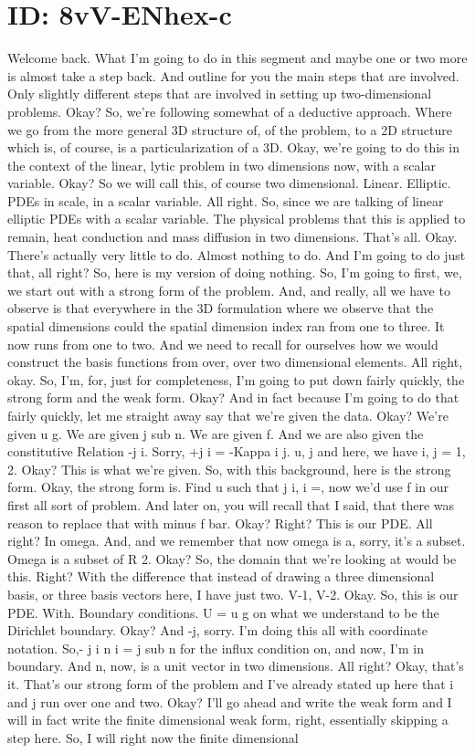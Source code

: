 \documentclass[10pt]{article}
\begin{document}
\section*{ID: 8vV-ENhex-c}
Welcome back. What I'm going to do in this segment and maybe one or two more is  almost take a step back. And outline for you the main steps that are involved. Only slightly different steps that are involved in setting up two-dimensional problems. Okay? So, we're following somewhat of a deductive approach. Where we go from the more general 3D structure of, of the problem, to a 2D structure which is, of course, is a particularization of a 3D. Okay, we're going to do this in the context of the linear, lytic problem in two dimensions now, with a scalar variable. Okay? So we will call this, of course two dimensional. Linear. Elliptic. PDEs in scale, in a scalar variable. All right. So, since we are talking of linear elliptic PDEs with a scalar variable. The physical problems that this is applied to remain, heat conduction and mass diffusion in two dimensions. That's all. Okay. There's actually very little to do. Almost nothing to do. And I'm going to do just that, all right? So, here is my version of doing nothing. So, I'm going to first, we, we start out with a strong form of the problem. And, and really, all we have to observe is that everywhere in the 3D formulation where we observe that the spatial dimensions could the spatial dimension index ran from one to three. It now runs from one to two. And we need to recall for ourselves how we would construct the basis functions from over, over two dimensional elements. All right, okay. So, I'm, for, just for completeness, I'm going to put down fairly quickly, the strong form and the weak form. Okay? And in fact because I'm going to do that fairly quickly, let me straight away say that we're given the data. Okay? We're given u g. We are given j sub n. We are given f. And we are also given the constitutive Relation  -j i. Sorry, +j i = -Kappa i j. u, j and here, we have i, j = 1, 2. Okay? This is what we're given. So, with this background, here is the strong form. Okay, the strong form is. Find u such that j i, i =, now we'd use f in our first all sort of problem. And later on, you will recall that I said, that there was reason to replace that with minus f bar. Okay? Right? This is our PDE. All right? In omega. And, and we remember that now omega is a, sorry, it's a subset. Omega is a subset of R 2. Okay? So, the domain that we're looking at would be this. Right? With the difference that instead of drawing a three dimensional basis, or three basis vectors here, I have just two. V-1, V-2. Okay. So, this is our PDE. With. Boundary conditions. U = u g on what we understand to be the Dirichlet boundary. Okay? And -j, sorry. I'm doing this all with coordinate notation. So,- j i n i = j sub n for the influx condition on, and now, I'm in boundary. And n, now, is a unit vector in two dimensions. All right? Okay, that's it. That's our strong form of the problem and I've already stated up here that i and j run over one and two. Okay? I'll go ahead and write the weak form and I will in fact write the finite dimensional weak form, right, essentially skipping a step here. So, I will right now the finite dimensional 
\end{document}
